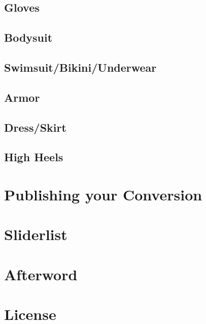 \documentclass[12pt]{article}
\begin{document}
\subsection{Gloves}

\pagebreak
\subsection{Bodysuit}

\pagebreak
\subsection{Swimsuit/Bikini/Underwear}

\subsection{Armor}

\pagebreak
\subsection{Dress/Skirt}

\pagebreak
\subsection{High Heels}

\pagebreak
\section{Publishing your Conversion}

\pagebreak
\section{Sliderlist}

\pagebreak
\section{Afterword}

\section{License}

\end{document}
